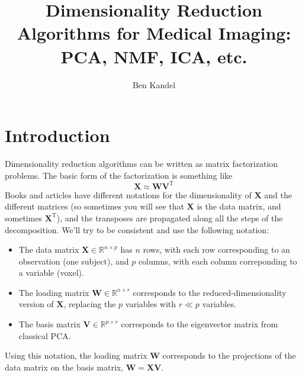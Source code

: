\documentclass{article}
\title{Dimensionality Reduction Algorithms for Medical Imaging: PCA, NMF, ICA, etc.}
\author{Ben Kandel}
\newcommand{\transpose}{^\mathrm{T}}
\begin{document}
\maketitle
\section*{Introduction}
Dimensionality reduction algorithms can be written as matrix factorization problems.  The basic form of the factorization is something like 
\begin{equation}
\mathbf{X} \approx \mathbf{WV}\transpose
\label{eqn:base}
\end{equation}
Books and articles have different notations for the dimensionality of $\mathbf{X}$ and the different matrices (so sometimes you will see that $\mathbf{X}$ is the data matrix, and sometimes $\mathbf{X}^{\mathrm{T}}$), and the transposes are propagated along all the steps of the decomposition.  We'll try to be consistent and use the following notation: 
\begin{itemize}
\item The data matrix $\mathbf{X} \in \mathbb{R}^{n \times p}$ has $n$ rows, with each row corresponding to an observation (one subject), and $p$ columns, with each column correponding to a variable (voxel). 
\item The loading matrix $\mathbf{W} \in \mathbb{R}^{n \times r}$ corresponds to the reduced-dimensionality version of $\mathbf{X}$, replacing the $p$ variables with $r \ll p$ variables.
\item The basis matrix  $\mathbf{V} \in \mathbb{R}^{p \times r}$ corresponds to the eigenvector matrix from classical PCA. 
\end{itemize}
Using this notation, the loading matrix $\mathbf{W}$ corresponds to the projections of the data matrix on the basis matrix, $\mathbf{W} = \mathbf{XV}$.  
 
\end{document}
